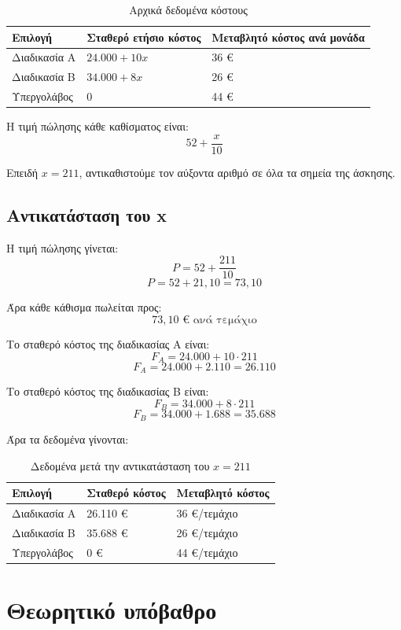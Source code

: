 \documentclass[12pt,a4paper]{article}
\begin{document}
\begin{table}[H]
\centering
\caption{Αρχικά δεδομένα κόστους}
\small
\begin{tabular}{p{3.4cm}p{4.4cm}p{4.2cm}}
\toprule
\textbf{Επιλογή} & \textbf{Σταθερό ετήσιο κόστος} & \textbf{Μεταβλητό κόστος ανά μονάδα} \\
\midrule
Διαδικασία Α & \(24.000 + 10x\) & 36 € \\
Διαδικασία Β & \(34.000 + 8x\) & 26 € \\
Υπεργολάβος & 0 & 44 € \\
\bottomrule
\end{tabular}
\end{table}

Η τιμή πώλησης κάθε καθίσματος είναι:
\[
52+\frac{x}{10}
\]

Επειδή \(x=211\), αντικαθιστούμε τον αύξοντα αριθμό σε όλα τα σημεία της άσκησης.

\subsection{Αντικατάσταση του x}

Η τιμή πώλησης γίνεται:
\[
P = 52+\frac{211}{10}
\]
\[
P = 52+21{,}10 = 73{,}10
\]

Άρα κάθε κάθισμα πωλείται προς:
\[
\boxed{73{,}10 \text{ € ανά τεμάχιο}}
\]

Το σταθερό κόστος της διαδικασίας Α είναι:
\[
F_A = 24.000 + 10 \cdot 211
\]
\[
F_A = 24.000 + 2.110 = 26.110
\]

Το σταθερό κόστος της διαδικασίας Β είναι:
\[
F_B = 34.000 + 8 \cdot 211
\]
\[
F_B = 34.000 + 1.688 = 35.688
\]

Άρα τα δεδομένα γίνονται:

\begin{table}[H]
\centering
\caption{Δεδομένα μετά την αντικατάσταση του \(x=211\)}
\small
\begin{tabular}{p{3.4cm}p{3.6cm}p{3.8cm}}
\toprule
\textbf{Επιλογή} & \textbf{Σταθερό κόστος} & \textbf{Μεταβλητό κόστος} \\
\midrule
Διαδικασία Α & 26.110 € & 36 €/τεμάχιο \\
Διαδικασία Β & 35.688 € & 26 €/τεμάχιο \\
Υπεργολάβος & 0 € & 44 €/τεμάχιο \\
\bottomrule
\end{tabular}
\end{table}

\section{Θεωρητικό υπόβαθρο}
\end{document}
